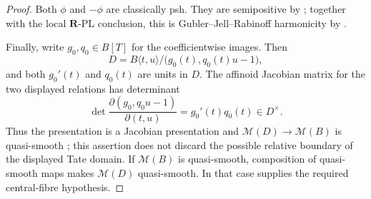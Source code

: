\begin{proof}
Both \(\phi\) and \(-\phi\) are classically psh.  They are semipositive by
\cite[Theorem~4.3]{GR25Classical}; together with the local
\(\mathbf R\)-PL conclusion, this is Gubler--Jell--Rabinoff harmonicity by
\cite[Definition~7.2]{GJR26}.

Finally, write \(g_0,q_0\in B[T]\) for the coefficientwise images.  Then
\[
 D=B\langle t,u\rangle/\bigl(g_0(t),q_0(t)u-1\bigr),
\]
and both \(g_0'(t)\) and \(q_0(t)\) are units in \(D\).  The affinoid
Jacobian matrix for the two displayed relations has determinant
\[
 \det\frac{\partial(g_0,q_0u-1)}{\partial(t,u)}
                         =g_0'(t)q_0(t)\in D^\times.
\]
Thus the presentation is a Jacobian presentation and
\(\mathcal M(D)\to\mathcal M(B)\) is quasi-smooth
\cite[Definitions~5.2.2 and~5.2.4]{Ducros18Families}; this assertion does
not discard the possible relative boundary of the displayed Tate domain.
If \(\mathcal M(B)\) is quasi-smooth, composition of quasi-smooth maps
\cite[\S5.2.13]{Ducros18Families} makes \(\mathcal M(D)\) quasi-smooth.
In that case
 supplies the required central-fibre
hypothesis.
\end{proof}
